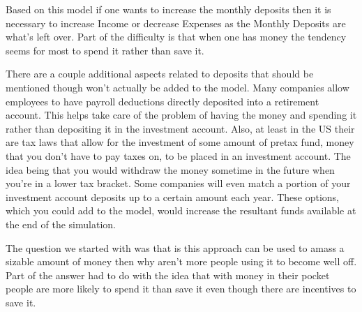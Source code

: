 \documentclass[]{memoir}
\begin{document}
Based on this model if one wants to increase the monthly deposits then
it is necessary to increase Income or decrease Expenses as the Monthly
Deposits are what's left over. Part of the difficulty is that when one
has money the tendency seems for most to spend it rather than save it.

There are a couple additional aspects related to deposits that should be
mentioned though won't actually be added to the model. Many companies
allow employees to have payroll deductions directly deposited into a
retirement account. This helps take care of the problem of having the
money and spending it rather than depositing it in the investment
account. Also, at least in the US their are tax laws that allow for the
investment of some amount of pretax fund, money that you don't have to
pay taxes on, to be placed in an investment account. The idea being that
you would withdraw the money sometime in the future when you're in a
lower tax bracket. Some companies will even match a portion of your
investment account deposits up to a certain amount each year. These
options, which you could add to the model, would increase the resultant
funds available at the end of the simulation.

The question we started with was that is this approach can be used to
amass a sizable amount of money then why aren't more people using it to
become well off. Part of the answer had to do with the idea that with
money in their pocket people are more likely to spend it than save it
even though there are incentives to save it.

\FloatBarrier 
\end{document}
